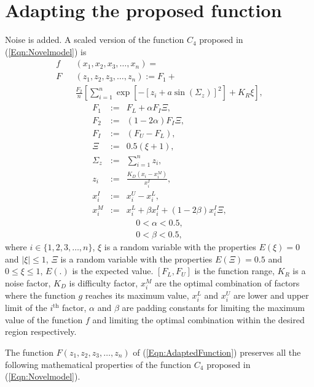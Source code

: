 \documentclass[twocolumn]{svjour3}          %
\begin{document}
\section{Adapting the proposed function}
\label{Sec:Adapting}
Noise is added.
A scaled version of the function $C_4$ proposed in (\ref{Eqn:Novelmodel}) is
\begin{eqnarray}
	f&&(x_1, x_2, x_3, \dots, x_n) = \nonumber \\
	F&&(z_1, z_2, z_3, \dots, z_n) := F_1 +  \nonumber \\
	&& \frac{F_2}{n}\left[\sum_{i=1}^{n}{\exp[-\left[z_i + a\sin\left(\Sigma_z\right)\right]^2]} + K_R\xi\right], \label{Eqn:AdaptedFunction}
\end{eqnarray}
\begin{eqnarray}
	F_1 &:=& F_L+\alpha F_I\Xi, \label{Eqn:F_1Equation} \\
	F_2 &:=& (1-2\alpha)F_I\Xi, \label{Eqn:F_2Equation} \\
	F_I &:=& (F_U-F_L), \label{Eqn:FunctionInterval} \\
	\Xi &:=& 0.5 (\xi + 1), \label{Eqn:ChangeOfRandomVar} \\
	\Sigma_z &:=& \sum_{i=1}^{n} z_i, \label{Eqn:SigmaZ} \\
	z_i &:=& \frac{K_D(x_i-x_i^M)}{x_i^I}, \label{Eqn:ZiDefinition} \\
	x_i^I &:=& x_i^U - x_i^L, \label{Eqn:InterDefinition} \\
	x_i^M &:=& x_i^L + \beta x_i^I+(1-2\beta)x_i^I\Xi, \label{Eqn:FactorAtMaximumValue}
\end{eqnarray}
\begin{eqnarray}
	0 < \alpha < 0.5, \label{Eqn:ConstraintsForAlpha} \\
	0 < \beta < 0.5, \label{Eqn:ConstraintsForBeta}
\end{eqnarray}
where  $i \in \{1, 2, 3, \dots, n\}$, $\xi$ is a random variable with the properties $E(\xi)=0$ and $|\xi|\le 1$, $\Xi$ is a random variable with the properties $E(\Xi)=0.5$ and $0 \le \xi \le 1$,  $E(.)$ is the expected value. $[F_L, F_U]$ is the function range, $K_R$ is a noise factor, $K_D$ is difficulty factor, $x_i^M$ are the optimal combination of factors where the function $g$ reaches its maximum value, $x_i^L$ and $x_i^U$ are lower and upper limit of the $i^{\text{th}}$ factor, $\alpha$ and $\beta$ are padding constants for limiting the maximum value of the function $f$ and limiting the optimal combination within the desired region respectively.
\par
The function $F(z_1, z_2, z_3, \dots, z_n)$ of (\ref{Eqn:AdaptedFunction}) preserves all the following mathematical properties of the function $C_4$ proposed in (\ref{Eqn:Novelmodel}).
\end{document}
